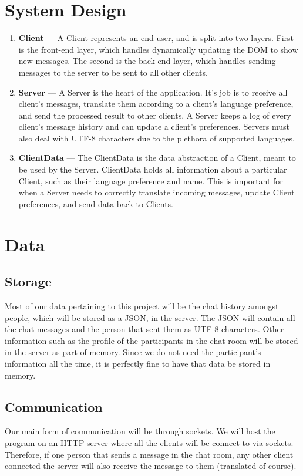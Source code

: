 \documentclass[12pt, letterpaper]{article}
\begin{document}
\section{System Design}
\begin{enumerate}
\item \textbf{Client} --- A Client represents an end user, and is split into two layers. First is the front-end layer, which handles dynamically updating the DOM to show new messages. The second is the back-end layer, which handles sending messages to the server to be sent to all other clients.
\item \textbf{Server} --- A Server is the heart of the application. It's job is to receive all client's messages, translate them according to a client's language preference, and send the processed result to other clients. A Server keeps a log of every client's message history and can update a client's preferences. Servers must also deal with UTF-8 characters due to the plethora of supported languages.
\item \textbf{ClientData} --- The ClientData is the data abstraction of a Client, meant to be used by the Server. ClientData holds all information about a particular Client, such as their language preference and name. This is important for when a Server needs to correctly translate incoming messages, update Client preferences, and send data back to Clients.
\end{enumerate}

\section{Data}
\subsection{Storage}
Most of our data pertaining to this project will be the chat history amongst people, which will be stored as a JSON, in the server. The JSON will contain all the chat messages and the person that sent them as UTF-8 characters. Other information such as the profile of the participants in the chat room will be stored in the server as part of memory. Since we do not need the participant's information all the time, it is perfectly fine to have that data be stored in memory. 

\subsection{Communication}
Our main form of communication will be through sockets. We will host the program on an HTTP server where all the clients will be connect to via sockets. Therefore, if one person that sends a message in the chat room, any other client connected the server will also receive the message to them (translated of course). 
\end{document}
